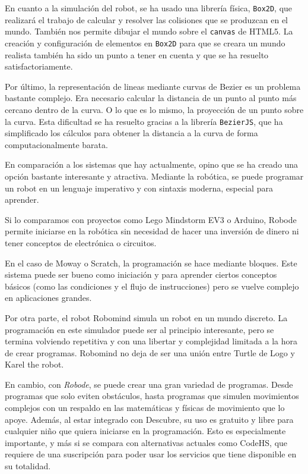 
En cuanto a la simulación del robot, se ha usado una librería física, \texttt{Box2D}, que realizará el trabajo de calcular y resolver las colisiones que se produzcan en el mundo. También nos permite dibujar el mundo sobre el \texttt{canvas} de HTML5. La creación y configuración de elementos en \texttt{Box2D} para que se creara un mundo realista también ha sido un punto a tener en cuenta y que se ha resuelto satisfactoriamente. 

Por último, la representación de lineas mediante curvas de Bezier es un problema bastante complejo. Era necesario calcular la distancia de un punto al punto más cercano dentro de la curva. O lo que es lo mismo, la proyección de un punto sobre la curva. Esta dificultad se ha resuelto gracias a la librería \texttt{BezierJS}, que ha simplificado los cálculos para obtener la distancia a la curva de forma computacionalmente barata. 


En comparación a los sistemas que hay actualmente, opino que se ha creado una opción bastante interesante y atractiva. Mediante la robótica, se puede programar un robot en un lenguaje imperativo y con sintaxis moderna, especial para aprender. 

Si lo comparamos con proyectos como Lego Mindstorm EV3 o Arduino, Robode permite iniciarse en la robótica sin necesidad de hacer una inversión de dinero ni tener conceptos de electrónica o circuitos.

En el caso de Moway o Scratch, la programación se hace mediante bloques. Este sistema puede ser bueno como iniciación y para aprender ciertos conceptos básicos (como las condiciones y el flujo de instrucciones) pero se vuelve complejo en aplicaciones grandes. 

Por otra parte, el robot Robomind simula un robot en un mundo discreto. La programación en este simulador puede ser al principio interesante, pero se termina volviendo repetitiva y con una libertar y complejidad limitada a la hora de crear programas. Robomind no deja de ser una unión entre Turtle de Logo y Karel the robot. 

En cambio, con \emph{Robode}, se puede crear una gran variedad de programas. Desde programas que solo eviten obstáculos, hasta programas que simulen movimientos complejos con un respaldo en las matemáticas y físicas de movimiento que lo apoye. Además, al estar integrado con Descubre, su uso es gratuito y libre para cualquier niño que quiera iniciarse en la programación. Esto es especialmente importante, y más si se compara con alternativas actuales como CodeHS, que requiere de una suscripción para poder usar los servicios que tiene disponible en su totalidad.



